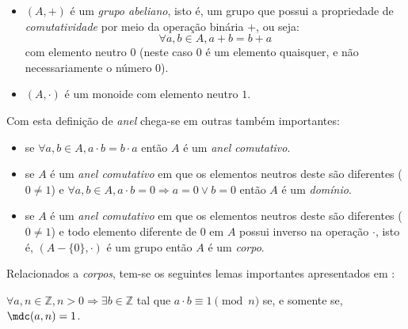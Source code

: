 \begin{itemize}
    \item $(A, +)$ é um \textit{grupo abeliano}, isto é, um grupo que possui a propriedade de \textit{comutatividade} por meio da operação binária $+$, ou seja:
    \begin{equation*}
        \forall a, b \in A, a + b = b + a
    \end{equation*}
    com elemento neutro $0$ (neste caso $0$ é um elemento quaisquer, e não necessariamente o número $0$).
    \item $(A, \cdot)$ é um monoide com elemento neutro $1$.
\end{itemize}
Com esta definição de \textit{anel} chega-se em outras também importantes:
\begin{itemize}
    \item se $\forall a, b \in A, a \cdot b = b \cdot a$ então $A$ é um \textit{anel comutativo}.

    \item se $A$ é um \textit{anel comutativo} em que os elementos neutros deste são diferentes ($0 \neq 1$) e $\forall a, b \in A, a \cdot b = 0 \Rightarrow a = 0 \lor b = 0$ então $A$ é um \textit{domínio}.

    \item se $A$ é um \textit{anel comutativo} em que os elementos neutros deste são diferentes ($0 \neq 1$) e todo elemento diferente de $0$ em $A$ possui inverso na operação $\cdot$, isto é, $(A - \{0\}, \cdot)$ é um grupo então $A$ é um \textit{corpo}.
\end{itemize}
Relacionados a \textit{corpos}, tem-se os seguintes lemas importantes apresentados em \cite{book:2399854}:
\begin{lema}
    $\forall a, n \in \mathbb{Z}, n > 0 \Rightarrow \exists b \in \mathbb{Z}$ tal que $a \cdot b \equiv 1 \pmod n$ se, e somente se, $\mdc(a, n) = 1$.
\end{lema}

